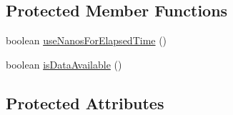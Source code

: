 \subsection*{Protected Member Functions}
\begin{DoxyCompactItemize}
\item 
boolean \mbox{\hyperlink{classcom_1_1mysql_1_1cj_1_1protocol_1_1a_1_1_native_protocol_a900d2347cc59f2b6eb37112a903e774d}{use\+Nanos\+For\+Elapsed\+Time}} ()
\item 
boolean \mbox{\hyperlink{classcom_1_1mysql_1_1cj_1_1protocol_1_1a_1_1_native_protocol_a9da03d669e459b563d2c8edfe5501ce7}{is\+Data\+Available}} ()
\end{DoxyCompactItemize}
\subsection*{Protected Attributes}
